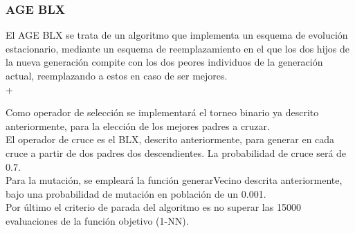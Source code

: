 \subsubsection{AGE BLX}
El AGE BLX se trata de un algoritmo que implementa un esquema de evolución estacionario, mediante un esquema de reemplazamiento en el que los dos hijos de la nueva generación compite con los dos peores individuos de la generación actual, reemplazando a estos en caso de ser mejores.\\ +

Como operador de selección se implementará el torneo binario ya descrito anteriormente, para la elección de los mejores padres a cruzar.\\ 

El operador de cruce es el BLX, descrito anteriormente, para generar en cada cruce a partir de dos padres dos descendientes. La probabilidad de cruce será de 0.7.\\ 

Para la mutación, se empleará la función generarVecino descrita anteriormente, bajo una probabilidad de mutación en población de un 0.001.\\ 

Por último el criterio de parada del algoritmo es no superar las 15000 evaluaciones de la función objetivo (1-NN).

